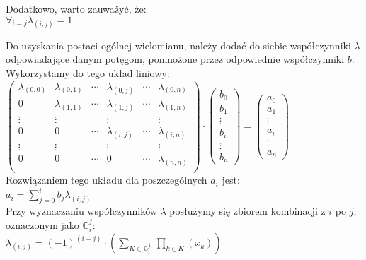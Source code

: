 \documentclass[a4paper,12pt]{article}
\newcommand{\id}{\noindent}
\newcommand{\el}[2]{\lambda_{(#1, #2)}}
\newcommand{\fa}[1]{\displaystyle\mathop{\forall}_{#1}}
\begin{document}
\id
Dodatkowo, warto zauważyć, że: \\

$\fa{i=j}\el{i}{j}=1$ \\

\newpage

\id
Do uzyskania postaci ogólnej wielomianu, należy dodać do siebie współczynniki $\lambda$ odpowiadające danym potęgom, pomnożone przez odpowiednie współczynniki $b$. Wykorzystamy do tego układ liniowy: \\

$\begin{pmatrix}
\lambda_{(0,0)} & \el{0}{1} & \cdots & \el{0}{j} & \cdots & \el{0}{n}\\ 
0 & \lambda_{(1,1)} & \cdots & \el{1}{j} & \cdots & \el{1}{n} \\ 
\vdots & \vdots & & \vdots & & \vdots\\ 
0 & 0 & \cdots & \lambda_{(i,j)} & \cdots & \el{i}{n}\\ 
\vdots & \vdots &  & \vdots &  & \vdots\\ 
0 & 0 & \cdots & 0 & \cdots & \lambda_{(n,n)}\\ 
\end{pmatrix}\cdot
\begin{pmatrix}
b_0 \\
b_1 \\
\vdots \\
b_i \\
\vdots \\
b_n
\end{pmatrix}
=
\begin{pmatrix}
a_0 \\
a_1 \\
\vdots \\
a_i \\
\vdots \\
a_n
\end{pmatrix}$ \\

\id
Rozwiązaniem tego układu dla poszczególnych $a_i$ jest: \\

$a_i = \sum\limits_{j=0}^{i}b_j\el{i}{j}$ \\

\id
Przy wyznaczaniu współczynników $\lambda$ posłużymy się zbiorem kombinacji z $i$ po $j$, oznaczonym jako $\mathbb{C}_i^j$: \\

$\el{i}{j} = (-1)^{(i+j)}\cdot \left( \sum\limits_{K \in \mathbb{C}_i^j} \ \prod\limits_{k \in K} \left( x_k \right) \right)$ \\
\end{document}
